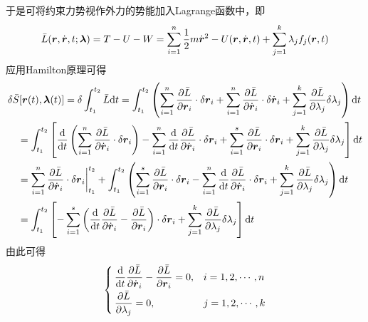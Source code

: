 于是可将约束力势视作外力的势能加入Lagrange函数中，即
\begin{equation}
	\bar{L}(\boldsymbol{r},\dot{\boldsymbol{r}},t;\boldsymbol{\lambda}) = T-U-W = \sum_{i=1}^n \frac12 m\dot{\boldsymbol{r}}^2 - U(\boldsymbol{r},\dot{\boldsymbol{r}},t) + \sum_{j=1}^k \lambda_j f_j(\boldsymbol{r},t)
\end{equation}
应用Hamilton原理可得
\begin{align*}
	& \delta \bar{S}[\boldsymbol{r}(t),\boldsymbol{\lambda}(t)] = \delta \int_{t_1}^{t_2} \bar{L} \mathrm{d} t = \int_{t_1}^{t_2} \left(\sum_{i=1}^n \frac{\partial \bar{L}}{\partial \boldsymbol{r}_i} \cdot \delta \boldsymbol{r}_i + \sum_{i=1}^n \frac{\partial \bar{L}}{\partial \dot{\boldsymbol{r}}_i} \cdot \delta \dot{\boldsymbol{r}}_i + \sum_{j=1}^k \frac{\partial \bar{L}}{\partial \lambda_j} \delta \lambda_j \right) \mathrm{d} t \\
	& \quad = \int_{t_1}^{t_2} \left[\frac{\mathrm{d}}{\mathrm{d} t} \left(\sum_{i=1}^n \frac{\partial \bar{L}}{\partial \dot{\boldsymbol{r}}_i} \cdot \delta \boldsymbol{r}_i\right) - \sum_{i=1}^n \frac{\mathrm{d}}{\mathrm{d} t} \frac{\partial \bar{L}}{\partial \dot{\boldsymbol{r}}_i} \cdot \delta \boldsymbol{r}_i + \sum_{i=1}^s \frac{\partial \bar{L}}{\partial \boldsymbol{r}_i} \cdot \delta \boldsymbol{r}_i + \sum_{j=1}^k \frac{\partial \bar{L}}{\partial \lambda_j} \delta \lambda_j\right] \mathrm{d} t \\
	& \quad = \sum_{i=1}^n \frac{\partial \bar{L}}{\partial \dot{\boldsymbol{r}}_i} \cdot \delta \boldsymbol{r}_i\bigg|_{t_1}^{t_2} + \int_{t_1}^{t_2} \left(\sum_{i=1}^s \frac{\partial \bar{L}}{\partial \boldsymbol{r}_i} \cdot \delta \boldsymbol{r}_i - \sum_{i=1}^n \frac{\mathrm{d}}{\mathrm{d} t} \frac{\partial \bar{L}}{\partial \dot{\boldsymbol{r}}_i} \cdot \delta \boldsymbol{r}_i + \sum_{j=1}^k \frac{\partial \bar{L}}{\partial \lambda_j} \delta \lambda_j\right) \mathrm{d} t \\
	& \quad = \int_{t_1}^{t_2} \left[-\sum_{i=1}^s \left(\frac{\mathrm{d}}{\mathrm{d} t} \frac{\partial \bar{L}}{\partial \dot{\boldsymbol{r}}_i} - \frac{\partial \bar{L}}{\partial \boldsymbol{r}_i}\right) \cdot \delta \boldsymbol{r}_i + \sum_{j=1}^k \frac{\partial \bar{L}}{\partial \lambda_j} \delta \lambda_j\right] \mathrm{d} t
\end{align*}
由此可得
\begin{equation}
	\begin{cases}
		\displaystyle \frac{\mathrm{d}}{\mathrm{d} t} \frac{\partial \bar{L}}{\partial \dot{\boldsymbol{r}}_i} - \frac{\partial \bar{L}}{\partial \boldsymbol{r}_i} = 0,& i=1,2,\cdots,n \\[1.5ex]
		\displaystyle \frac{\partial \bar{L}}{\partial \lambda_j} = 0,& j = 1,2,\cdots,k
	\end{cases}
\end{equation}

